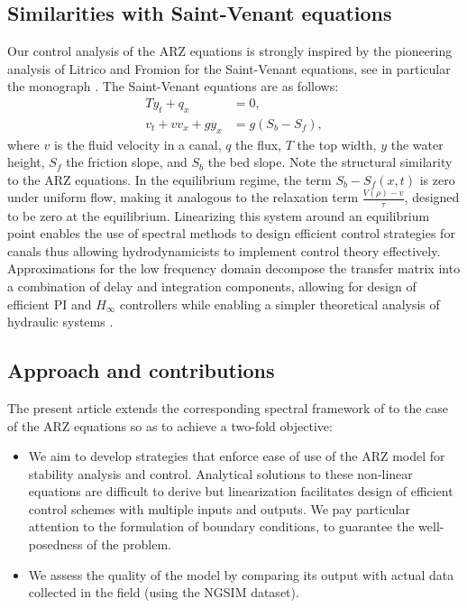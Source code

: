 \documentclass[preprint]{elsarticle}
\begin{document}
\subsection{Similarities with Saint-Venant equations}
Our control analysis of the ARZ equations is strongly
inspired by the pioneering analysis of Litrico and Fromion for the Saint-Venant equations, see in particular the monograph \cite{litrico2009modeling}. The Saint-Venant equations are as follows:
\begin{align}
Ty_t+q_x&=0, \\
v_t + vv_x + gy_x&=g\left(S_{b}-S_{f}\right),
\end{align}
where $v$ is the fluid velocity in a canal, $q$ the flux, $T$ the top width, $y$ the water height, $S_f$ the friction slope, and $S_b$ the bed slope. Note the structural similarity to the ARZ equations. In the equilibrium regime, the term $S_{b}-S_{f}\left(x,t\right)$ is zero under uniform flow, making it analogous to the relaxation term $\frac{V(\rho)-v}{\tau}$, designed to be zero at the equilibrium. Linearizing this system around an equilibrium point enables the use of spectral methods to design efficient control strategies for canals \cite{Litricoapplic} thus allowing hydrodynamicists to implement control theory effectively. Approximations for the low frequency domain decompose the transfer matrix into a combination of delay and integration components, allowing for design of efficient PI and $H_\infty$ controllers while enabling a simpler theoretical analysis of hydraulic systems \cite{litrico2009modeling, Litricoapplic}.

\subsection{Approach and contributions}
The present article extends the corresponding spectral framework of \cite{litrico2009modeling} to the case of the ARZ equations so as to achieve a two-fold objective:

\begin{itemize}
\item We aim to develop strategies that enforce ease of use of the ARZ model for stability analysis and control. Analytical solutions to these non-linear equations are difficult to derive but linearization facilitates design of efficient control schemes with multiple inputs and outputs. We pay particular attention to the formulation of boundary conditions, to guarantee the well-posedness of the problem.
\item We assess the quality of the model by comparing its output with actual data collected in the field (using the NGSIM dataset). 
\end{itemize}
\end{document}
